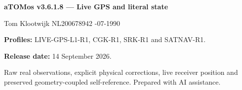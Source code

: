 \documentclass[11pt,a4paper]{article}
\begin{document}
\normalsize
\vfill
\begin{panel}
\textbf{aTOMos v3.6.1.8 --- Live GPS and literal state}\par
Tom Klootwijk \quad NL200678942 -07-1990\par
\textbf{Profiles:} LIVE-GPS-L1-R1, CGK-R1, SRK-R1 and SATNAV-R1.\par
\textbf{Release date:} 14 September 2026.\par
Raw real observations, explicit physical corrections, live receiver position and
preserved geometry-coupled self-reference. Prepared with AI assistance.
\end{panel}
\end{document}
